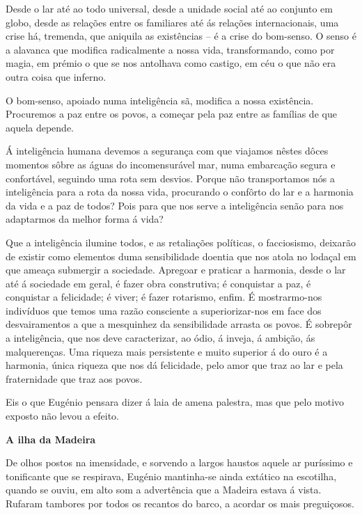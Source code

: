 \documentclass[9pt]{article}
\begin{document}
{Desde o lar até ao todo universal, desde a unidade social até ao conjunto em globo, desde as rela\-ções entre os familiares até ás rela\-ções internacionais, uma crise há, tremenda, que aniquila as exis\-tên\-cias -- é a crise do
bom-senso. O senso é a alavanca que modifi\-ca radicalmente a nossa vida, transformando, como por magia, em prémio o que se nos anto\-lhava como castigo, em
céu o que não era outra coisa que inferno.

O bom-senso, apoiado numa inteligência sã, modifi\-ca a nossa exis\-tên\-cia.
Procuremos a paz entre os povos, a começar pela paz entre as fa\-mí\-lias de
que aquela depende.

Á inteligência humana devemos a seguran\-ça com que viajamos nês\-tes dôces momentos sôbre as águas do incomensurável mar, numa embarca\-ção segura
e confortável, seguindo uma rota sem desvios. Porque não transportamos nós
a inteligência para a rota da nossa vida, procurando o con\-fôr\-to do lar e a
harmonia da vida e a paz de todos? Pois para que nos serve a inteligência
senão para nos adaptarmos da me\-lhor forma á vida?

Que a inteligência ilumine todos, e as retalia\-ções políticas, o facciosismo, deixarão de existir como elementos duma sensibilidade doentia que
nos atola no lodaçal em que ameaça submergir a sociedade. Apregoar e praticar a harmonia, desde o lar até á sociedade em geral, é fazer obra construtiva; é conquistar a paz, é conquistar a felicidade; é viver; é fazer
rotarismo, enfim. É mos\-trar\-mo-nos indivíduos que temos uma razão consciente a superiorizar-nos em face dos desvairamentos a que a mesquinhez da
sensibilidade arrasta os povos. É sobrepôr a inteligência, que nos deve
ca\-ra\-cte\-ri\-zar, ao ódio, á inveja, á ambi\-ção, ás malquerenças. Uma riqueza mais
persistente e muito superior á do ouro é a harmonia, única riqueza que nos
dá felicidade, pelo amor que traz ao lar e pela fraternidade que traz aos
povos.
}%

Eis o que Eugé\-nio pensara dizer á laia de amena palestra, mas que pelo
motivo exposto não levou a efeito.

\begin{center}\bf\large A i\-lha da Madeira\end{center}

De o\-lhos postos na imensidade, e sorvendo a largos haustos aquele ar
puríssimo e tonifi\-cante que se respirava, Eugé\-nio mantinha-se ainda extático na escoti\-lha, quan\-do se ouviu, em alto som a advertência que a Madeira
estava á vista. Rufaram tambores por todos os recantos do barco, a acordar
os mais preguiçosos.
\end{document}
